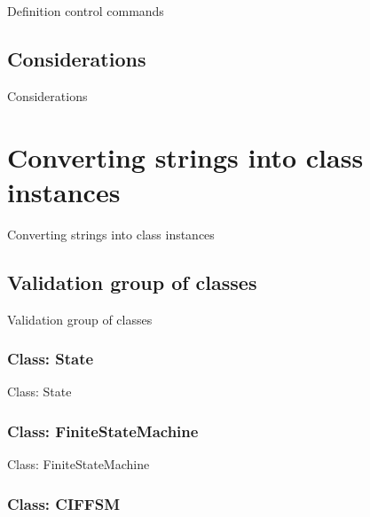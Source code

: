 \documentclass[11pt,twoside,openany,x11names,svgnames]{memoir}
\begin{document}
Definition control commands

\subsection{Considerations}\label{Considerations2}

Considerations

\section{Converting strings into class instances}\label{Converting-strings-into-class-instances}

Converting strings into class instances

\subsection{Validation group of classes}\label{Validation-group-of-classes}

Validation group of classes

\subsubsection{Class: State}\label{Class-State}

Class: State

\subsubsection{Class: FiniteStateMachine}\label{Class-FiniteStateMachine}

Class: FiniteStateMachine

\subsubsection{Class: CIFFSM}\label{Class-CIFFSM}
\end{document}
